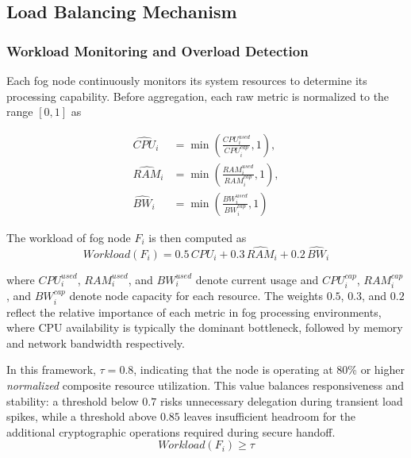\documentclass[conference]{IEEEtran}
\begin{document}
    \subsection{Load Balancing Mechanism}
    \label{sec:lb}
    \subsubsection{Workload Monitoring and Overload Detection}

    Each fog node continuously monitors its system resources to determine its processing capability. Before aggregation, each raw metric is normalized to the range $[0,1]$ as

    \begin{equation}
    \begin{aligned}
    \widehat{CPU}_i &= \min\!\left(\frac{CPU_i^{used}}{CPU_i^{cap}},1\right),\\
    \widehat{RAM}_i &= \min\!\left(\frac{RAM_i^{used}}{RAM_i^{cap}},1\right),\\
    \widehat{BW}_i &= \min\!\left(\frac{BW_i^{used}}{BW_i^{cap}},1\right)
    \end{aligned}
    \end{equation}

    The workload of fog node $F_i$ is then computed as
    \begin{equation}
    Workload(F_i) = 0.5\,\widehat{CPU}_i + 0.3\,\widehat{RAM}_i + 0.2\,\widehat{BW}_i
    \label{eq:workload-definition}
    \end{equation}

    where $CPU_i^{used}$, $RAM_i^{used}$, and $BW_i^{used}$ denote current usage and $CPU_i^{cap}$, $RAM_i^{cap}$, and $BW_i^{cap}$ denote node capacity for each resource. The weights $0.5$, $0.3$, and $0.2$ reflect the relative importance of each metric in fog processing environments, where CPU availability is typically the dominant bottleneck, followed by memory and network bandwidth respectively.

    In this framework, $\tau = 0.8$, indicating that the node is operating at 80\% or higher \emph{normalized} composite resource utilization. This value balances responsiveness and stability: a threshold below $0.7$ risks unnecessary delegation during transient load spikes, while a threshold above $0.85$ leaves insufficient headroom for the additional cryptographic operations required during secure handoff.
    \begin{equation}
    Workload(F_i) \geq \tau
    \end{equation}
\end{document}
